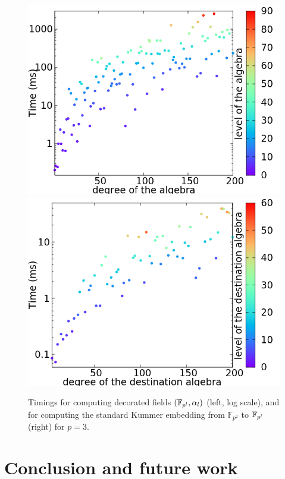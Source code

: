 \documentclass{sig-alternate}
\begin{document}
\begin{figure}[h]
  \centering
  \includegraphics[scale=.24]{solve_h90-3.png}
  \includegraphics[scale=.24]{embed-3.png}
  \caption{Timings for computing decorated fields
    $(\mathbb{F}_{p^l},\alpha_l)$ (left, log scale), and for computing the
    standard Kummer embedding from $\mathbb{F}_{p^2}$ to $\mathbb{F}_{p^l}$
    (right) for $p=3$.}
  \label{fig:timings}
\end{figure}

\section{Conclusion and future work}
\label{sec:conclusion}
\end{document}
